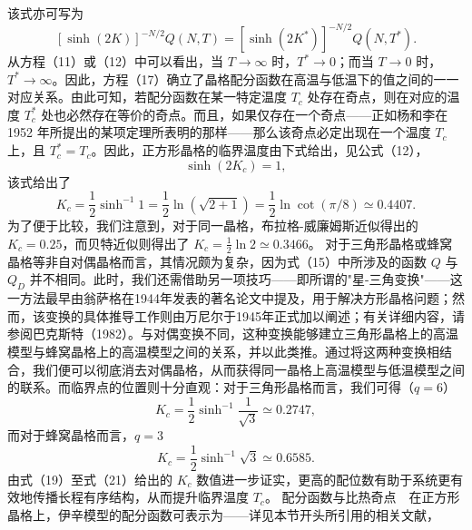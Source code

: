 该式亦可写为
\begin{equation}\tag{13.1.94}\label{eq:13.1.94}
[ \sinh ( 2 K ) ] ^{- N / 2} Q ( N , T ) = [ \sinh ( 2 K ^{*} ) ] ^{- N / 2} Q ( N , T ^{*} ) .
\end{equation}
从方程（11）或（12）中可以看出，当 \(T \to \infty\) 时，\(T^{*} \to 0\)；而当 \(T \to 0\) 时，\(T^{*} \to \infty\)。因此，方程（17）确立了晶格配分函数在高温与低温下的值之间的一一对应关系。由此可知，若配分函数在某一特定温度 \(T_c\) 处存在奇点，则在对应的温度 \(T_c^*\) 处也必然存在等价的奇点。而且，如果仅存在一个奇点——正如杨和李在 1952 年所提出的某项定理所表明的那样——那么该奇点必定出现在一个温度 \(T_c\) 上，且 \(T_c^* = T_c\)。因此，正方形晶格的临界温度由下式给出，见公式（12），
\begin{equation}\tag{13.1.95}\label{eq:13.1.95}
\sinh ( 2 K _ { c } ) = 1 ,
\end{equation}
该式给出了
\begin{equation}\tag{13.1.96}\label{eq:13.1.96}
K _ { c } = \frac { 1 } { 2 } \sinh ^{- 1} 1 = \frac { 1 } { 2 } \ln ( \sqrt { 2 + 1 } ) = \frac { 1 } { 2 } \ln \cot ( \pi / 8 ) \simeq 0 . 44 07 .
\end{equation}
为了便于比较，我们注意到，对于同一晶格，布拉格-威廉姆斯近似得出的 \(K_{c} = 0.25\)，而贝特近似则得出了 \(K_{c} = \frac{1}{2}\ln 2 \simeq 0.3466\)。
对于三角形晶格或蜂窝晶格等非自对偶晶格而言，其情况颇为复杂，因为式（15）中所涉及的函数 \(Q\) 与 \(Q_{D}\) 并不相同。此时，我们还需借助另一项技巧——即所谓的"星-三角变换"——这一方法最早由翁萨格在1944年发表的著名论文中提及，用于解决方形晶格问题；然而，该变换的具体推导工作则由万尼尔于1945年正式加以阐述；有关详细内容，请参阅巴克斯特（1982）。与对偶变换不同，这种变换能够建立三角形晶格上的高温模型与蜂窝晶格上的高温模型之间的关系，并以此类推。通过将这两种变换相结合，我们便可以彻底消去对偶晶格，从而获得同一晶格上高温模型与低温模型之间的联系。而临界点的位置则十分直观：对于三角形晶格而言，我们可得（\(q=6\)）
\begin{equation}\tag{13.1.97}\label{eq:13.1.97}
K _ { c } = \frac { 1 } { 2 } \sinh ^{- 1} \frac { 1 } { \sqrt { 3 } } \simeq 0 . 27 47 ,
\end{equation}
而对于蜂窝晶格而言，\(q=3\)
\begin{equation}\tag{13.1.98}\label{eq:13.1.98}
K _ { c } = \frac { 1 } { 2 } \sinh ^{- 1} \sqrt { 3 } \simeq 0 . 65 85 .
\end{equation}
由式（19）至式（21）给出的 \(K_{c}\) 数值进一步证实，更高的配位数有助于系统更有效地传播长程有序结构，从而提升临界温度 \(T_{c}\)。
配分函数与比热奇点　在正方形晶格上，伊辛模型的配分函数可表示为——详见本节开头所引用的相关文献，
